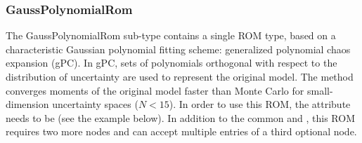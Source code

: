 \subsubsection{GaussPolynomialRom}
\label{subsubsec:GaussPolynomialRom}
The GaussPolynomialRom sub-type contains a single ROM type, based on a
characteristic Gaussian polynomial fitting scheme: generalized polynomial chaos
expansion (gPC).
%
In gPC, sets of polynomials orthogonal with respect to the distribution of uncertainty
are used to represent the original model.  The method converges moments of the original
model faster than Monte Carlo for small-dimension uncertainty spaces ($N<15$).
%
In order to use this ROM, the  attribute  needs to
be  (see the example below).
%
In addition to the common  and , this ROM requires
two more nodes and can accept multiple entries of a third optional node.
